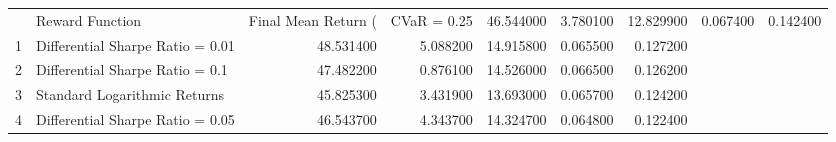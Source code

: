 \begin{tabular}{llrrrrr}
\toprule
 & Reward Function & Final Mean Return (%
 & CVaR = 0.25 & 46.544000 & 3.780100 & 12.829900 & 0.067400 & 0.142400 \\
1 & Differential Sharpe Ratio = 0.01 & 48.531400 & 5.088200 & 14.915800 & 0.065500 & 0.127200 \\
2 & Differential Sharpe Ratio = 0.1 & 47.482200 & 0.876100 & 14.526000 & 0.066500 & 0.126200 \\
3 & Standard Logarithmic Returns & 45.825300 & 3.431900 & 13.693000 & 0.065700 & 0.124200 \\
4 & Differential Sharpe Ratio = 0.05 & 46.543700 & 4.343700 & 14.324700 & 0.064800 & 0.122400 \\
\bottomrule
\end{tabular}

